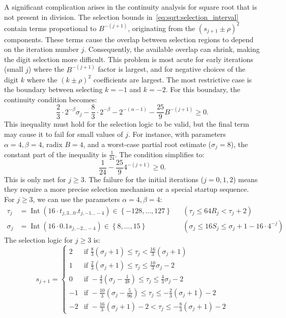 \documentclass{article}
\DeclareMathOperator{\Int}{Int}
\begin{document}
A significant complication arises in the continuity analysis for square root that is not present in division.
The selection bounds in~\cref{eq:sqrt:selection_interval} contain terms proportional to $B^{-(j+1)}$, originating from the $(s_{j+1} \pm \rho)^2$ components.
These terms cause the overlap between selection regions to depend on the iteration number $j$.
Consequently, the available overlap can shrink, making the digit selection more difficult.
This problem is most acute for early iterations (small $j$) where the $B^{-(j+1)}$ factor is largest, and for negative choices of the digit $k$ where the $(k \pm \rho)^2$ coefficients are largest.
The most restrictive case is the boundary between selecting $k = -1$ and $k = -2$.
For this boundary, the continuity condition becomes:
\[
  \frac{2}{3} \cdot 2^{-\beta} \sigma_j - \frac{8}{3} \cdot 2^{-\beta} - 2^{-(\alpha-1)} - \frac{25}{9} B^{-(j+1)} \geq 0.
\]
This inequality must hold for the selection logic to be valid, but the final term may cause it to fail for small values of $j$.
For instance, with parameters $\alpha = 4, \beta = 4$, radix $B = 4$, and a worst-case partial root estimate ($\sigma_j = 8$), the constant part of the inequality is $\frac{1}{24}$.
The condition simplifies to:
\[
  \frac{1}{24} - \frac{25}{9} 4^{-(j+1)} \geq 0.
\]
This is only met for $j \geq 3$.
The failure for the initial iterations ($j = 0, 1, 2$) means they require a more precise selection mechanism or a special startup sequence.
For $j \geq 3$, we can use the parameters $\alpha = 4, \beta = 4$:
\begin{align}
  \label{eq:sqrt:radix4_tau_val}
  \tau_j &= \Int(16 \cdot t_{j,3\ldots0}.t_{j,-1\ldots-4}) \in \left\{-128, \dots, 127\right\} && (\tau_j \leq 64 R_j < \tau_j + 2) \\
  \label{eq:sqrt:radix4_sigma_val}
  \sigma_j &= \Int(16 \cdot 0.1s_{j,-2\ldots-4}) \in \left\{8, \dots, 15\right\} && (\sigma_j \leq 16 S_j \leq \sigma_j + 1 - 16 \cdot 4^{-j})
\end{align}
The selection logic for $j \geq 3$ is:
\begin{equation}
  \label{eq:sqrt:radix4_logic}
  s_{j+1} =
  \begin{cases}
    2  & \text{if } \frac{8}{3} (\sigma_j + 1) \leq \tau_j < \frac{16}{3} (\sigma_j + 1) \\
    1  & \text{if } \frac{2}{3} (\sigma_j + 1) \leq \tau_j \leq \frac{10}{3} \sigma_j - 2 \\
    0  & \text{if } -\frac{4}{3} \left(\sigma_j - \frac{1}{48}\right) \leq \tau_j \leq \frac{4}{3} \sigma_j - 2 \\
    -1 & \text{if } -\frac{10}{3} \left(\sigma_j - \frac{5}{96}\right) \leq \tau_j \leq -\frac{2}{3} (\sigma_j + 1) - 2 \\
    -2 & \text{if } -\frac{16}{3} (\sigma_j + 1) - 2 < \tau_j \leq -\frac{8}{3} (\sigma_j + 1) - 2
  \end{cases}
\end{equation}
\end{document}
